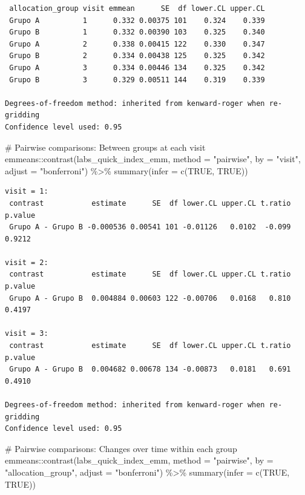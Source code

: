 \documentclass[
  letterpaper,
  DIV=11,
  numbers=noendperiod]{scrartcl}
\newenvironment{Shaded}{\begin{snugshade}}{\end{snugshade}}
\newcommand{\AttributeTok}[1]{\textcolor[rgb]{0.40,0.45,0.13}{#1}}
\newcommand{\CommentTok}[1]{\textcolor[rgb]{0.37,0.37,0.37}{#1}}
\newcommand{\ConstantTok}[1]{\textcolor[rgb]{0.56,0.35,0.01}{#1}}
\newcommand{\FunctionTok}[1]{\textcolor[rgb]{0.28,0.35,0.67}{#1}}
\newcommand{\NormalTok}[1]{\textcolor[rgb]{0.00,0.23,0.31}{#1}}
\newcommand{\SpecialCharTok}[1]{\textcolor[rgb]{0.37,0.37,0.37}{#1}}
\newcommand{\StringTok}[1]{\textcolor[rgb]{0.13,0.47,0.30}{#1}}
\begin{document}
\begin{verbatim}
 allocation_group visit emmean      SE  df lower.CL upper.CL
 Grupo A          1      0.332 0.00375 101    0.324    0.339
 Grupo B          1      0.332 0.00390 103    0.325    0.340
 Grupo A          2      0.338 0.00415 122    0.330    0.347
 Grupo B          2      0.334 0.00438 125    0.325    0.342
 Grupo A          3      0.334 0.00446 134    0.325    0.342
 Grupo B          3      0.329 0.00511 144    0.319    0.339

Degrees-of-freedom method: inherited from kenward-roger when re-gridding 
Confidence level used: 0.95 
\end{verbatim}

\begin{Shaded}
\begin{Highlighting}[]
\CommentTok{\# Pairwise comparisons: Between groups at each visit}
\NormalTok{emmeans}\SpecialCharTok{::}\FunctionTok{contrast}\NormalTok{(labs\_quick\_index\_emm, }\AttributeTok{method =} \StringTok{"pairwise"}\NormalTok{, }\AttributeTok{by =} \StringTok{"visit"}\NormalTok{, }\AttributeTok{adjust =} \StringTok{"bonferroni"}\NormalTok{) }\SpecialCharTok{\%\textgreater{}\%} \FunctionTok{summary}\NormalTok{(}\AttributeTok{infer =} \FunctionTok{c}\NormalTok{(}\ConstantTok{TRUE}\NormalTok{, }\ConstantTok{TRUE}\NormalTok{))}
\end{Highlighting}
\end{Shaded}

\begin{verbatim}
visit = 1:
 contrast           estimate      SE  df lower.CL upper.CL t.ratio p.value
 Grupo A - Grupo B -0.000536 0.00541 101 -0.01126   0.0102  -0.099  0.9212

visit = 2:
 contrast           estimate      SE  df lower.CL upper.CL t.ratio p.value
 Grupo A - Grupo B  0.004884 0.00603 122 -0.00706   0.0168   0.810  0.4197

visit = 3:
 contrast           estimate      SE  df lower.CL upper.CL t.ratio p.value
 Grupo A - Grupo B  0.004682 0.00678 134 -0.00873   0.0181   0.691  0.4910

Degrees-of-freedom method: inherited from kenward-roger when re-gridding 
Confidence level used: 0.95 
\end{verbatim}

\begin{Shaded}
\begin{Highlighting}[]
\CommentTok{\# Pairwise comparisons: Changes over time within each group}
\NormalTok{emmeans}\SpecialCharTok{::}\FunctionTok{contrast}\NormalTok{(labs\_quick\_index\_emm, }\AttributeTok{method =} \StringTok{"pairwise"}\NormalTok{, }\AttributeTok{by =} \StringTok{"allocation\_group"}\NormalTok{, }\AttributeTok{adjust =} \StringTok{"bonferroni"}\NormalTok{) }\SpecialCharTok{\%\textgreater{}\%} \FunctionTok{summary}\NormalTok{(}\AttributeTok{infer =} \FunctionTok{c}\NormalTok{(}\ConstantTok{TRUE}\NormalTok{, }\ConstantTok{TRUE}\NormalTok{))}
\end{Highlighting}
\end{Shaded}
\end{document}
